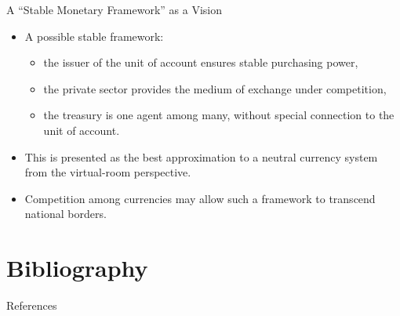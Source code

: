 \documentclass[11pt,aspectratio=169]{beamer}
\begin{document}
\begin{frame}{A ``Stable Monetary Framework'' as a Vision}
\small
\begin{itemize}
  \item A possible stable framework:
  \begin{itemize}
    \item the issuer of the unit of account ensures stable purchasing power,
    \item the private sector provides the medium of exchange under competition,
    \item the treasury is one agent among many, without special connection to the unit of account.
  \end{itemize}
  \item This is presented as the best approximation to a neutral currency system from the virtual-room perspective.
  \item Competition among currencies may allow such a framework to transcend national borders.
\end{itemize}
\end{frame}

\section{Bibliography}

\begin{frame}[allowframebreaks]{References}
\printbibliography
\end{frame}
\end{document}
